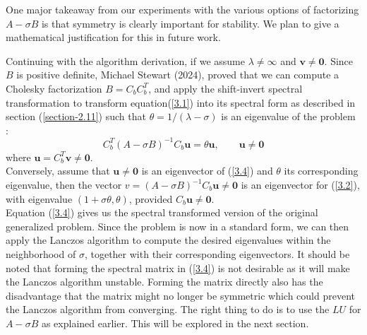 One major takeaway from our experiments with the various options of factorizing $A-\sigma B$ is that symmetry is clearly important for stability. We plan to give a mathematical justification for this in future work.

Continuing with the algorithm derivation, if we assume $\lambda \neq \infty$ and $\mathbf{v} \neq \mathbf{0}$. Since $B$ is positive definite, Michael Stewart (2024), proved that we can compute a Cholesky factorization $B = C_bC_b^T$, and apply the shift-invert spectral transformation to transform equation(\ref{3.1}) into its spectral form as described in section (\ref{section-2.11}) such that $\theta = 1/(\lambda - \sigma)$ is an eigenvalue of the problem :
\begin{equation}\label{3.4}
	C_b^T (A-\sigma B)^{-1} C_b \mathbf{u} = \theta \mathbf{u}, \qquad \mathbf{u} \neq \mathbf{0}
\end{equation}
where  $\mathbf{u} = C_b^T \mathbf{v} \neq \mathbf{0}.$\\
Conversely, assume that $\mathbf{u} \neq \mathbf{0}$ is an eigenvector of (\ref{3.4}) and $\theta$ its corresponding eigenvalue, then the vector $v = (A-\sigma B)^{-1}C_b \mathbf{u} \neq \mathbf{0}$ is an eigenvector for (\ref{3.2}), with eigenvalue $(1+\sigma \theta, \theta)$, provided $C_b\mathbf{u} \neq \mathbf{0}$.\\[10pt]
Equation (\ref{3.4}) gives us the spectral transformed version of the original generalized problem. Since the problem is now in a standard form, we can then apply the Lanczos algorithm to compute the desired eigenvalues within the neighborhood of $\sigma$, together with their corresponding eigenvectors. It should be noted that forming the spectral matrix in (\ref{3.4}) is not desirable as it will make the Lanczos algorithm unstable. Forming the matrix directly also has the disadvantage that the matrix might no longer be symmetric which could prevent the Lanczos algorithm from converging. The right thing to do is to use the $LU$ for $A-\sigma B$ as explained earlier. This will be explored in the next section.
